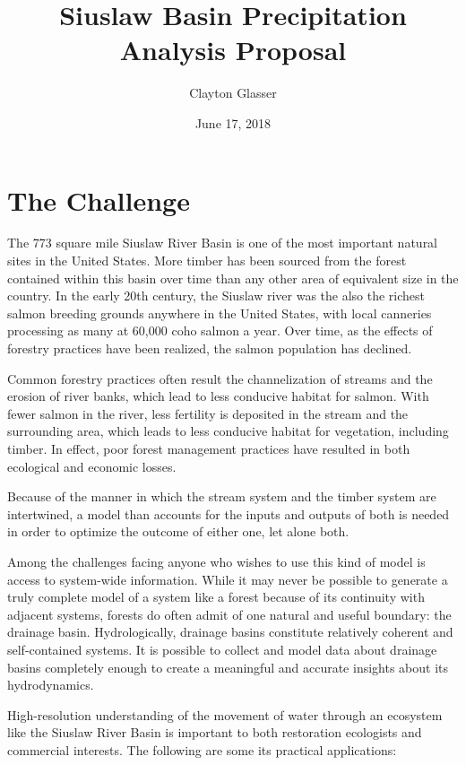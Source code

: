 \documentclass[]{article}
\title{Siuslaw Basin Precipitation Analysis Proposal}
\author{Clayton Glasser}
\date{June 17, 2018}
\begin{document}
\maketitle

\section{The Challenge}\label{the-challenge}

The 773 square mile Siuslaw River Basin is one of the most important
natural sites in the United States. More timber has been sourced from
the forest contained within this basin over time than any other area of
equivalent size in the country. In the early 20th century, the Siuslaw
river was the also the richest salmon breeding grounds anywhere in the
United States, with local canneries processing as many at 60,000 coho
salmon a year. Over time, as the effects of forestry practices have been
realized, the salmon population has declined.

Common forestry practices often result the channelization of streams and
the erosion of river banks, which lead to less conducive habitat for
salmon. With fewer salmon in the river, less fertility is deposited in
the stream and the surrounding area, which leads to less conducive
habitat for vegetation, including timber. In effect, poor forest
management practices have resulted in both ecological and economic
losses.

Because of the manner in which the stream system and the timber system
are intertwined, a model than accounts for the inputs and outputs of
both is needed in order to optimize the outcome of either one, let alone
both.

Among the challenges facing anyone who wishes to use this kind of model
is access to system-wide information. While it may never be possible to
generate a truly complete model of a system like a forest because of its
continuity with adjacent systems, forests do often admit of one natural
and useful boundary: the drainage basin. Hydrologically, drainage basins
constitute relatively coherent and self-contained systems. It is
possible to collect and model data about drainage basins completely
enough to create a meaningful and accurate insights about its
hydrodynamics.

High-resolution understanding of the movement of water through an
ecosystem like the Siuslaw River Basin is important to both restoration
ecologists and commercial interests. The following are some its
practical applications:
\end{document}
